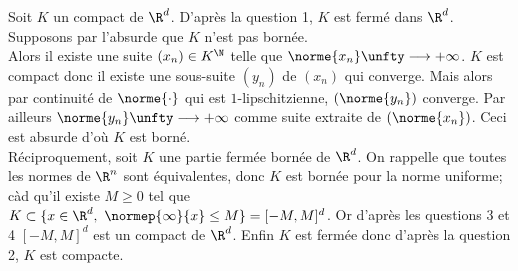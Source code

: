 \documentclass{book}
\begin{document}
\begin{enumerate}[leftmargin=*]
		Soit $K$ un compact de $\R^d$. D'après la question 1, $K$ est fermé dans $\R^d$. Supposons par l'absurde que $K$ n'est pas bornée.\\
		Alors il existe une suite $(x_n)\in K^\N$ telle que $\norme{x_n}\unfty\longrightarrow+\infty$. $K$ est compact donc il existe une sous-suite $(y_n)$ de $(x_n)$ qui converge. Mais alors par continuité de $\norme{\cdot}$ qui est $1$-lipschitzienne, $(\norme{y_n})$ converge. Par ailleurs $\norme{y_n}\unfty\longrightarrow+\infty$ comme suite extraite de $(\norme{x_n})$. Ceci est absurde d'où $K$ est borné.\\
		Réciproquement, soit $K$ une partie fermée bornée de $\R^d$. On rappelle que toutes les normes de $\R^n$ sont équivalentes, donc $K$ est bornée pour la norme uniforme; càd qu'il existe $M\geq 0$ tel que $K\subset\{x\in \R^d,\ \normep{\infty}{x}\leq M\}=[-M,M]^d$. Or d'après les questions 3 et 4 $[-M,M]^d$ est un compact de $\R^d$. Enfin $K$ est fermée donc d'après la question 2, $K$ est compacte.
	\end{enumerate}
	
\end{document}

